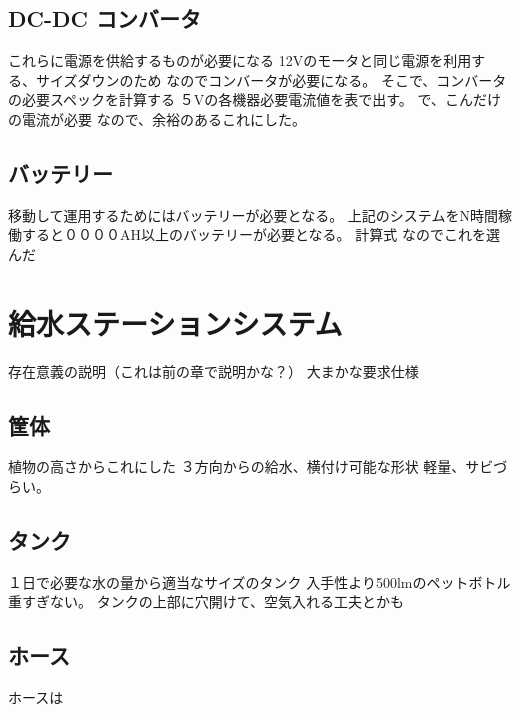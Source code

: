 \subsection{DC-DC コンバータ}
これらに電源を供給するものが必要になる
12Vのモータと同じ電源を利用する、サイズダウンのため
なのでコンバータが必要になる。
そこで、コンバータの必要スペックを計算する
５Vの各機器必要電流値を表で出す。
で、こんだけの電流が必要
なので、余裕のあるこれにした。
\subsection{バッテリー}
移動して運用するためにはバッテリーが必要となる。
上記のシステムをN時間稼働すると００００AH以上のバッテリーが必要となる。
計算式
なのでこれを選んだ

\section{給水ステーションシステム}
存在意義の説明（これは前の章で説明かな？）
大まかな要求仕様

\subsection{筐体}
植物の高さからこれにした
３方向からの給水、横付け可能な形状
軽量、サビづらい。

\subsection{タンク}
１日で必要な水の量から適当なサイズのタンク
入手性より500lmのペットボトル
重すぎない。
タンクの上部に穴開けて、空気入れる工夫とかも

\subsection{ホース}
ホースは
